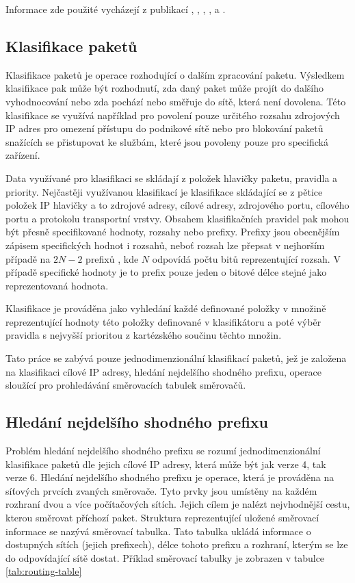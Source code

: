 Informace zde použité vycházejí z publikací \cite{bspl}, \cite{tbm}, \cite{aho}, \cite{gigabit-networking}, \cite{phe-design} a \cite{meduna}.

\subsection{Klasifikace paketů}

Klasifikace paketů je operace rozhodující o dalším zpracování paketu.
Výsledkem klasifikace pak může být rozhodnutí, zda daný paket může projít do
dalšího vyhodnocování nebo zda pochází nebo směřuje do sítě, která není dovolena.
Této klasifikace se využívá například pro povolení pouze určitého rozsahu zdrojových IP adres
pro omezení přístupu do podnikové sítě nebo pro blokování paketů snažících se přistupovat
ke službám, které jsou povoleny pouze pro specifická zařízení.

Data využívané pro klasifikaci se skládají z položek hlavičky paketu, pravidla a priority.
Nejčastěji využívanou klasifikací je klasifikace skládající se z pětice položek IP hlavičky
a to zdrojové adresy, cílové adresy, zdrojového portu, cílového portu a protokolu transportní vrstvy.
Obsahem klasifikačních pravidel pak mohou být přesně specifikované hodnoty, rozsahy nebo prefixy.
Prefixy jsou obecnějším zápisem specifických hodnot i rozsahů, neboť rozsah lze přepsat v nejhorším
případě na $2N - 2$ prefixů \cite{clasification-prefix}, kde $N$ odpovídá počtu bitů reprezentující rozsah. V případě specifické hodnoty je to prefix pouze jeden o bitové délce stejné jako reprezentovaná hodnota.

Klasifikace je prováděna jako vyhledání každé definované položky v množině reprezentující hodnoty
této položky definované v klasifikátoru a poté výběr pravidla s nejvyšší prioritou z kartézského součinu těchto množin.

Tato práce se zabývá pouze jednodimenzionální klasifikací paketů, jež je založena na klasifikaci cílové IP
adresy, hledání nejdelšího shodného prefixu, operace sloužící pro prohledávání směrovacích tabulek směrovačů.

\subsection{Hledání nejdelšího shodného prefixu}\label{section:lpm} %
Problém hledání nejdelšího shodného prefixu se rozumí jednodimenzionální klasifikace paketů dle
jejich cílové IP adresy, která může být jak verze 4, tak verze 6.
Hledání nejdelšího shodného prefixu je operace, která je prováděna
na síťových prvcích zvaných směrovače. Tyto prvky jsou umístěny na každém rozhraní dvou a více
počítačových sítích. Jejich cílem je nalézt nejvhodnější cestu, kterou směrovat příchozí paket.
Struktura reprezentující uložené směrovací informace se nazývá směrovací tabulka.
Tato tabulka ukládá informace o dostupných sítích (jejich prefixech), délce tohoto prefixu a rozhraní,
kterým se lze do odpovídající sítě dostat. Příklad směrovací tabulky je zobrazen v tabulce \ref{tab:routing-table}


